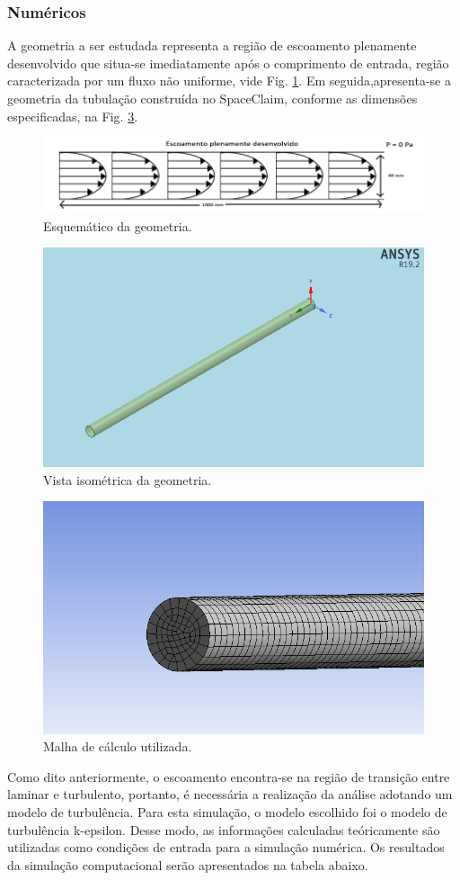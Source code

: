 \documentclass[12pt]{article}
\begin{document}
\subsubsection{Numéricos}

A geometria a ser estudada representa a região de escoamento plenamente desenvolvido que situa-se imediatamente após o comprimento de entrada, região caracterizada por um fluxo não uniforme, vide Fig. \ref{fig:schematics}. Em seguida,apresenta-se a geometria da tubulação construída no SpaceClaim, conforme as dimensões especificadas, na Fig. \ref{fig:isometric}.


\begin{figure}[H]
    \centering
    \includegraphics[width=.6\textwidth]{fig/schematics.png}
    \caption{Esquemático da geometria.}
		\label{fig:schematics}
\end{figure}

\begin{figure}[H]
    \centering
    \includegraphics[width=.5\textwidth]{fig/isometric_view.png}
    \caption{Vista isométrica da geometria.}
		\label{fig:isometric}
\end{figure}

\begin{figure}[H]
    \centering
    \includegraphics[width=.5\textwidth]{fig/mesh.png}
    \caption{Malha de cálculo utilizada.}
		\label{fig:isometric}
\end{figure}

Como dito anteriormente, o escoamento encontra-se na região de transição entre laminar e turbulento, portanto, é necessária a realização da análise adotando um modelo de turbulência. Para esta simulação, o modelo escolhido foi o modelo de turbulência k-epsilon. Desse modo, as informações calculadas teóricamente são utilizadas como condições de entrada para a simulação numérica. Os resultados da simulação computacional serão apresentados na tabela abaixo. 
\end{document}
